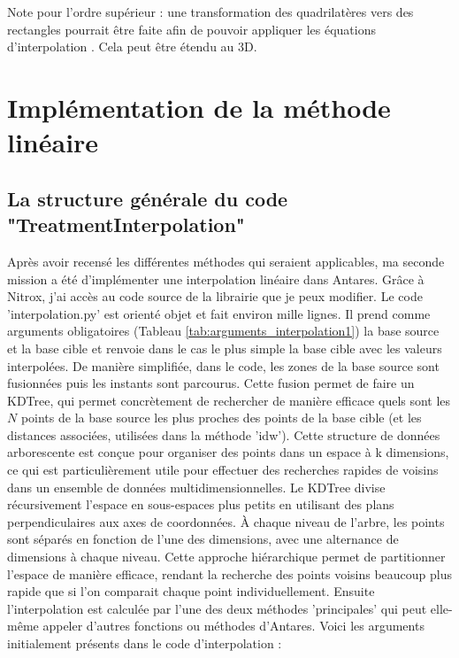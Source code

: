 Note pour l'ordre supérieur : une transformation des quadrilatères vers des rectangles pourrait être faite afin de pouvoir appliquer les équations d'interpolation \cite{camarero2024}. Cela peut être étendu au 3D.




\newpage
\section{Implémentation de la méthode linéaire}

\subsection{La structure générale du code "TreatmentInterpolation"}

Après avoir recensé les différentes méthodes qui seraient applicables, ma seconde mission a été d'implémenter une interpolation linéaire dans Antares. Grâce à Nitrox, j'ai accès au code source de la librairie que je peux modifier. Le code 'interpolation.py' est orienté objet et fait environ mille lignes. 
Il prend comme arguments obligatoires (Tableau \ref{tab:arguments_interpolation1}) la base source et la base cible et renvoie dans le cas le plus simple la base cible avec les valeurs interpolées.
De manière simplifiée, dans le code, les zones de la base source sont fusionnées puis les instants sont parcourus. 
Cette fusion permet de faire un \ac{KDTree}, qui permet concrètement de rechercher de manière efficace quels sont les \( N \) points de la base source les plus proches des points de la base cible (et les distances associées, utilisées dans la méthode 'idw').
Cette structure de données arborescente est conçue pour organiser des points dans un espace à k dimensions, ce qui est particulièrement utile pour effectuer des recherches rapides de voisins dans un ensemble de données multidimensionnelles.
Le KDTree divise récursivement l'espace en sous-espaces plus petits en utilisant des plans perpendiculaires aux axes de coordonnées. À chaque niveau de l'arbre, les points sont séparés en fonction de l'une des dimensions, avec une alternance de dimensions à chaque niveau. Cette approche hiérarchique permet de partitionner l'espace de manière efficace, rendant la recherche des points voisins beaucoup plus rapide que si l'on comparait chaque point individuellement.
Ensuite l'interpolation est calculée par l'une des deux méthodes 'principales' qui peut elle-même appeler d'autres fonctions ou méthodes d'Antares.
Voici les arguments initialement présents dans le code d'interpolation :


